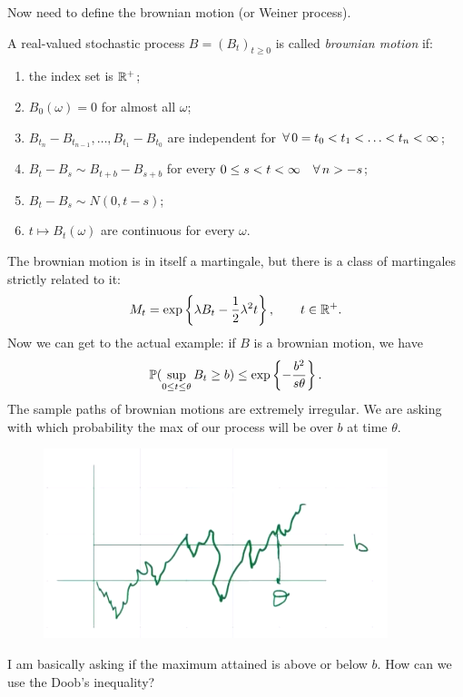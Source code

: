 \documentclass{report}
\begin{document}
\begin{example}
	Now need to define the brownian motion (or Weiner process).
	\begin{definition}
		A real-valued stochastic process $B={(B_{t})}_{t\geq0}$ is called \emph{brownian motion} if:
		\begin{enumerate}
			\item the index set is $\mathbb{R}^{+}$;
			\item $B_{0}(\omega)=0$ for almost all $\omega$;
			\item $B_{t_{n}}-B_{t_{n-1}},\ldots,B_{t_{1}}-B_{t_{0}}$ are independent for $\forall\, 0=t_{0}<t_1<\ldots<t_n<\infty$;
			\item $B_{t}-B_{s}\sim B_{t+b}-B_{s+b}$ for every $0\leq s<t<\infty\quad\forall\, n>- s$;
			\item $B_{t}-B_{s}\sim N(0,t-s)$;
			\item $t\mapsto B_{t}(\omega)$ are continuous for every $\omega$.
		\end{enumerate}
	\end{definition}
	The brownian motion is in itself a martingale, but there is a class of martingales strictly related to it:
	\begin{equation*}
		M_{t}=\exp\left\{\lambda B_{t}-\frac{1}{2}\lambda^{2}t\right\},\qquad t\in\mathbb{R}^{+}.
	\end{equation*}
	Now we can get to the actual example: if $B$ is a brownian motion, we have 
	\begin{equation*}
		\mathbb{P}(\sup_{0\leq t\leq\theta}B_{t}\geq b)\leq\exp\left\{-\frac{b^{2}}{s\theta}\right\}.
	\end{equation*}
	The sample paths of brownian motions are extremely irregular. We are asking with which probability the max of our process will be over $b$ at time $\theta$.
	\begin{figure}[H]
		\centering
		\includegraphics[width=0.6\linewidth]{screenshot018}
		\label{fig:screenshot018}
	\end{figure}
	I am basically asking if the maximum attained is above or below $b$.
	How can we use the Doob's inequality?

\end{example}
\end{document}
